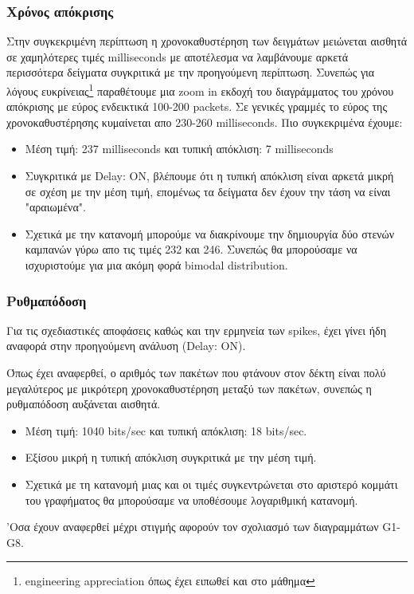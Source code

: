 \documentclass[hidelinks, 12pt, a4paper]{article}
\begin{document}
\subsubsection{Χρόνος απόκρισης}
Στην συγκεκριμένη περίπτωση η χρονοκαθυστέρηση των δειγμάτων μειώνεται αισθητά σε χαμηλότερες τιμές milliseconds με αποτέλεσμα να λαμβάνουμε αρκετά περισσότερα δείγματα συγκριτικά με την προηγούμενη περίπτωση. Συνεπώς για λόγους ευκρίνειας\footnote{engineering appreciation όπως έχει ειπωθεί και στο μάθημα} παραθέτουμε μια zoom in εκδοχή του διαγράμματος του χρόνου απόκρισης με εύρος ενδεικτικά 100-200 packets. Σε γενικές γραμμές το εύρος της χρονοκαθυστέρησης κυμαίνεται απο 230-260 milliseconds. Πιο συγκεκριμένα έχουμε:
\begin{itemize}
    \item Μέση τιμή: 237 milliseconds και τυπική απόκλιση: 7 milliseconds 
    \item Συγκριτικά με Delay: ON, βλέπουμε ότι η τυπική απόκλιση είναι αρκετά μικρή σε σχέση με την μέση τιμή, επομένως τα δείγματα δεν έχουν την τάση να είναι "αραιωμένα".
    \item Σχετικά με την κατανομή μπορούμε να διακρίνουμε την δημιουργία δύο στενών καμπανών γύρω απο τις τιμές 232 και 246. Συνεπώς θα μπορούσαμε να ισχυριστούμε για μια ακόμη φορά bimodal distribution. 
\end{itemize}

\subsubsection{Ρυθμαπόδοση}
Για τις σχεδιαστικές αποφάσεις καθώς και την ερμηνεία των spikes, έχει γίνει ήδη αναφορά στην προηγούμενη ανάλυση (Delay: ON).

Όπως έχει αναφερθεί, ο αριθμός των πακέτων που φτάνουν στον δέκτη είναι πολύ μεγαλύτερος με μικρότερη χρονοκαθυστέρηση μεταξύ των πακέτων, συνεπώς η ρυθμαπόδοση αυξάνεται αισθητά.
\begin{itemize}
    \item Μέση τιμή: 1040 bits/sec και τυπική απόκλιση: 18 bits/sec.
    \item Εξίσου μικρή η τυπική απόκλιση συγκριτικά με την μέση τιμή.
    \item Σχετικά με τη κατανομή μιας και οι τιμές συγκεντρώνεται στο αριστερό κομμάτι του γραφήματος θα μπορούσαμε να υποθέσουμε λογαριθμική κατανομή.
\end{itemize}


'Οσα έχουν αναφερθεί μέχρι στιγμής αφορούν τον σχολιασμό των διαγραμμάτων G1-G8.
\end{document}
